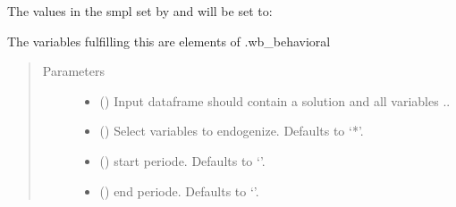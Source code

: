 \documentclass[letterpaper,10pt,english]{sphinxmanual}
\begin{document}
\begin{fulllineitems}
\begin{fulllineitems}
\begin{sphinxVerbatim}[commandchars=\\\{\}]
  
\end{sphinxVerbatim}

\sphinxAtStartPar
The values in the smpl set by  and  will be set to:

\begin{sphinxVerbatim}[commandchars=\\\{\}]
  
  
\end{sphinxVerbatim}

\sphinxAtStartPar
The variables fulfilling this are elements of .wb\_behavioral
\begin{quote}\begin{description}
\item[{Parameters}] \leavevmode\begin{itemize}
\item {} 
\sphinxAtStartPar
{} () \textendash{} Input dataframe should contain a solution and all variables ..

\item {} 
\sphinxAtStartPar
{} (\sphinxstyleliteralemphasis{\sphinxupquote{, }}) \textendash{} Select variables to endogenize. Defaults to ‘*’.

\item {} 
\sphinxAtStartPar
{} (\sphinxstyleliteralemphasis{\sphinxupquote{, }}) \textendash{} start periode. Defaults to ‘’.

\item {} 
\sphinxAtStartPar
{} (\sphinxstyleliteralemphasis{\sphinxupquote{, }}) \textendash{} end periode. Defaults to ‘’.

\end{itemize}


\end{description}
\end{quote}
\end{fulllineitems}
\end{fulllineitems}
\end{document}
